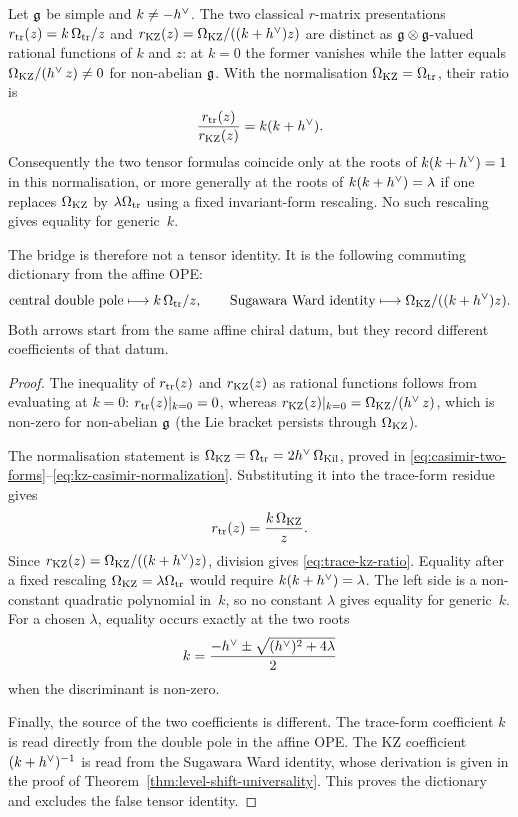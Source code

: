 \begin{theorem}
\label{thm:trace-KZ-convention-bridge}
\ClaimStatusProvedHere
Let $\mathfrak{g}$ be simple and $k \neq -h^{\vee}$. The two classical $r$-matrix
presentations $r_{\mathrm{tr}}(z) = k\,\Omega_{\mathrm{tr}} / z$ and
$r_{\mathrm{KZ}}(z) = \Omega_{\mathrm{KZ}} / ((k + h^{\vee}) z)$ are distinct as
$\mathfrak{g} \otimes \mathfrak{g}$-valued rational functions of $k$ and $z$: at $k = 0$
the former vanishes while the latter equals $\Omega_{\mathrm{KZ}} / (h^{\vee}\,z) \neq 0$
for non-abelian $\mathfrak{g}$. With the normalisation
$\Omega_{\mathrm{KZ}}=\Omega_{\mathrm{tr}}$, their ratio is
\begin{equation}\label{eq:trace-kz-ratio}
 \frac{r_{\mathrm{tr}}(z)}{r_{\mathrm{KZ}}(z)} = k(k+h^{\vee}).
\end{equation}
Consequently the two tensor formulas coincide only at the roots of
$k(k+h^{\vee})=1$ in this normalisation, or more generally at the roots of
$k(k+h^{\vee})=\lambda$ if one replaces $\Omega_{\mathrm{KZ}}$ by
$\lambda\Omega_{\mathrm{tr}}$ using a fixed invariant-form rescaling. No such
rescaling gives equality for generic~$k$.

The bridge is therefore not a tensor identity. It is the following
commuting dictionary from the affine OPE:
\[
 \text{central double pole}
 \longmapsto
 k\,\Omega_{\mathrm{tr}}/z,
 \qquad
 \text{Sugawara Ward identity}
 \longmapsto
 \Omega_{\mathrm{KZ}}/((k+h^{\vee})z).
\]
Both arrows start from the same affine chiral datum, but they record
different coefficients of that datum.
\end{theorem}

\begin{proof}
The inequality of $r_{\mathrm{tr}}(z)$ and $r_{\mathrm{KZ}}(z)$ as rational functions follows
from evaluating at $k = 0$: $r_{\mathrm{tr}}(z)|_{k = 0} = 0$, whereas
$r_{\mathrm{KZ}}(z)|_{k = 0} = \Omega_{\mathrm{KZ}}/(h^{\vee}\,z)$, which is non-zero for
non-abelian $\mathfrak{g}$ (the Lie bracket persists through $\Omega_{\mathrm{KZ}}$).

The normalisation statement is
$\Omega_{\mathrm{KZ}}=\Omega_{\mathrm{tr}}=2h^{\vee}\,\Omega_{\mathrm{Kil}}$, proved in
\eqref{eq:casimir-two-forms}--\eqref{eq:kz-casimir-normalization}.
Substituting it into the trace-form residue gives
\[
 r_{\mathrm{tr}}(z)=\frac{k\,\Omega_{\mathrm{KZ}}}{z}.
\]
Since $r_{\mathrm{KZ}}(z)=\Omega_{\mathrm{KZ}}/((k+h^{\vee})z)$, division gives
\eqref{eq:trace-kz-ratio}. Equality after a fixed rescaling
$\Omega_{\mathrm{KZ}}=\lambda\Omega_{\mathrm{tr}}$ would require $k(k+h^{\vee})=\lambda$.
The left side is a non-constant quadratic polynomial in~$k$, so no
constant $\lambda$ gives equality for generic~$k$. For a chosen
$\lambda$, equality occurs exactly at the two roots
\[
 k=\frac{-h^{\vee}\pm\sqrt{(h^{\vee})^2+4\lambda}}{2}
\]
when the discriminant is non-zero.

Finally, the source of the two coefficients is different. The
trace-form coefficient $k$ is read directly from the double pole in
the affine OPE. The KZ coefficient $(k+h^{\vee})^{-1}$ is read from the
Sugawara Ward identity, whose derivation is given in the proof of
Theorem~\ref{thm:level-shift-universality}. This proves the dictionary
and excludes the false tensor identity.
\end{proof}

